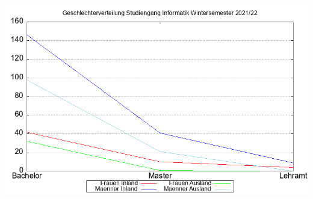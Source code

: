 \documentclass{article}
\begin{document}
\begin{center}
		\includegraphics[scale=0.50]{graph4.png}
	\end{center}
\end{document}
